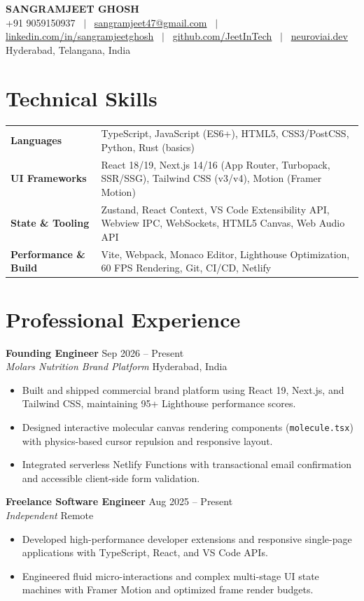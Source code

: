\documentclass[10pt]{article}
\makeatletter
\newcommand{\resumeHeader}{
\begin{center}
{\LARGE \textbf{SANGRAMJEET GHOSH}} \\[3pt]
{\small
+91 9059150937 ~$|$~
\href{mailto:sangramjeet47@gmail.com}{sangramjeet47@gmail.com} ~$|$~
\href{https://www.linkedin.com/in/sangramjeetghosh}{linkedin.com/in/sangramjeetghosh} ~$|$~
\href{https://github.com/JeetInTech}{github.com/JeetInTech} ~$|$~
\href{https://neuroviai.dev}{neuroviai.dev}
}\\[1pt]
{\footnotesize Hyderabad, Telangana, India}
\end{center}
\vspace{-8pt}
}
\makeatother
\begin{document}
\resumeHeader

\section*{Technical Skills}
\begin{tabularx}{\textwidth}{@{}l X@{}}
\textbf{Languages} & TypeScript, JavaScript (ES6+), HTML5, CSS3/PostCSS, Python, Rust (basics) \\[1.5pt]
\textbf{UI Frameworks} & React 18/19, Next.js 14/16 (App Router, Turbopack, SSR/SSG), Tailwind CSS (v3/v4), Motion (Framer Motion) \\[1.5pt]
\textbf{State \& Tooling} & Zustand, React Context, VS Code Extensibility API, Webview IPC, WebSockets, HTML5 Canvas, Web Audio API \\[1.5pt]
\textbf{Performance \& Build} & Vite, Webpack, Monaco Editor, Lighthouse Optimization, 60 FPS Rendering, Git, CI/CD, Netlify \\
\end{tabularx}

\section*{Professional Experience}
\textbf{Founding Engineer} \hfill Sep 2026 -- Present \\
\textit{Molars Nutrition Brand Platform} \hfill Hyderabad, India
\begin{itemize}
    \item Built and shipped commercial brand platform using React 19, Next.js, and Tailwind CSS, maintaining 95+ Lighthouse performance scores.
    \item Designed interactive molecular canvas rendering components (\texttt{molecule.tsx}) with physics-based cursor repulsion and responsive layout.
    \item Integrated serverless Netlify Functions with transactional email confirmation and accessible client-side form validation.
\end{itemize}

\vspace{1.5pt}
\textbf{Freelance Software Engineer} \hfill Aug 2025 -- Present \\
\textit{Independent} \hfill Remote
\begin{itemize}
    \item Developed high-performance developer extensions and responsive single-page applications with TypeScript, React, and VS Code APIs.
    \item Engineered fluid micro-interactions and complex multi-stage UI state machines with Framer Motion and optimized frame render budgets.
\end{itemize}
\end{document}

